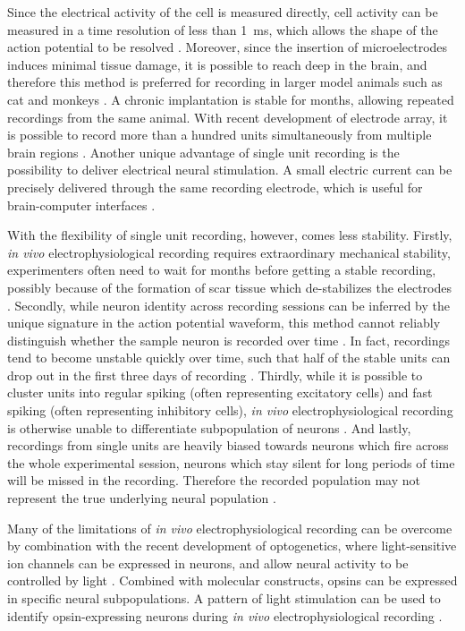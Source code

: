 Since the electrical activity of the cell is measured directly, cell activity can be measured in a time resolution of less than \SI{1}{\ms}, which allows the shape of the action potential to be resolved \citep{lutcke13}. Moreover, since the insertion of microelectrodes induces minimal tissue damage, it is possible to reach deep in the brain, and therefore this method is preferred for recording in larger model animals such as cat and monkeys \citep{lutcke13}. A chronic implantation is stable for months, allowing repeated recordings from the same animal. With recent development of electrode array, it is possible to record more than a hundred units simultaneously from multiple brain regions \citep{berenyi14, xie16}. Another unique advantage of single unit recording is the possibility to deliver electrical neural stimulation. A small electric current can be precisely delivered through the same recording electrode, which is useful for brain-computer interfaces \citep{hatsopoulos09}. 

With the flexibility of single unit recording, however, comes less stability. Firstly, \textit{in vivo} electrophysiological recording requires extraordinary mechanical stability, experimenters often need to wait for months before getting a stable recording, possibly because of the formation of scar tissue which de-stabilizes the electrodes \citep{jackson07}. Secondly, while neuron identity across recording sessions can be inferred by the unique signature in the action potential waveform, this method cannot reliably distinguish whether the sample neuron is recorded over time \citep{rousche98, schmitzer-torbert04, tolias07}. In fact, recordings tend to become unstable quickly over time, such that half of the stable units can drop out in the first three days of recording \citep{fraser12}. Thirdly, while it is possible to cluster units into regular spiking (often representing excitatory cells) and fast spiking (often representing inhibitory cells), \textit{in vivo} electrophysiological recording is otherwise unable to differentiate subpopulation of neurons \citep{connors90}. And lastly, recordings from single units are heavily biased towards neurons which fire across the whole experimental session, neurons which stay silent for long periods of time will be missed in the recording. Therefore the recorded population may not represent the true underlying neural population \citep{lutcke13}. 

Many of the limitations of \textit{in vivo} electrophysiological recording can be overcome by combination with the recent development of optogenetics, where light-sensitive ion channels can be expressed in neurons, and allow neural activity to be controlled by light \citep{yizhar11}. Combined with molecular constructs, opsins can be expressed in specific neural subpopulations. A pattern of light stimulation can be used to identify opsin-expressing neurons during \textit{in vivo} electrophysiological recording \citep{zhao11}. 

